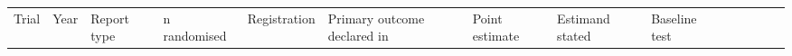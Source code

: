 {
\begin{longtable}[]{@{}
  >{\raggedright\arraybackslash}p{}
  >{\raggedright\arraybackslash}p{}
  >{\raggedright\arraybackslash}p{}
  >{\raggedleft\arraybackslash}p{}
  >{\raggedright\arraybackslash}p{}
  >{\raggedright\arraybackslash}p{}
  >{\raggedright\arraybackslash}p{}
  >{\raggedright\arraybackslash}p{}
  >{\raggedright\arraybackslash}p{}
  >{\raggedright\arraybackslash}p{}
  >{\raggedright\arraybackslash}p{}
  >{\raggedright\arraybackslash}p{}
  >{\raggedright\arraybackslash}p{}
  >{\raggedright\arraybackslash}p{}@{}}
\toprule\noalign{}
\begin{minipage}[b]{\linewidth}\raggedright
Trial
\end{minipage} & \begin{minipage}[b]{\linewidth}\raggedright
Year
\end{minipage} & \begin{minipage}[b]{\linewidth}\raggedright
Report type
\end{minipage} & \begin{minipage}[b]{\linewidth}\raggedleft
n randomised
\end{minipage} & \begin{minipage}[b]{\linewidth}\raggedright
Registration
\end{minipage} & \begin{minipage}[b]{\linewidth}\raggedright
Primary outcome declared in
\end{minipage} & \begin{minipage}[b]{\linewidth}\raggedright
Point estimate
\end{minipage} & \begin{minipage}[b]{\linewidth}\raggedright
Estimand stated
\end{minipage} & \begin{minipage}[b]{\linewidth}\raggedright
Baseline test
\end{minipage} & \begin{minipage}[b]{\linewidth}\raggedright

\end{minipage}
\end{longtable}}
